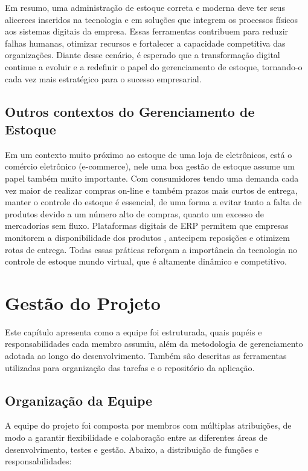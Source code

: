 \documentclass[
	12pt,				%
	openany,			%
	twoside,			%
	a4paper,			%
	english,			%
	brazil				%
	]{abntex2}
\begin{document}
Em resumo, uma administração de estoque correta e moderna deve ter seus alicerces inseridos na tecnologia e em soluções que integrem os processos físicos aos sistemas digitais da empresa. Essas ferramentas contribuem para reduzir falhas humanas, otimizar recursos e fortalecer a capacidade competitiva das organizações. Diante desse cenário, é esperado que a transformação digital continue a evoluir e a redefinir o papel do gerenciamento de estoque, tornando-o cada vez mais estratégico para o sucesso empresarial.

\section{Outros contextos do Gerenciamento de Estoque}
Em um contexto muito próximo ao estoque de uma loja de eletrônicos, está o comércio eletrônico (e-commerce), nele uma boa gestão de estoque assume um papel também muito importante. Com consumidores tendo uma demanda cada vez maior de realizar compras on-line e também prazos mais curtos de entrega, manter o controle do estoque é essencial, de uma forma a evitar tanto a falta de produtos devido a um número alto de compras, quanto um excesso de mercadorias sem fluxo. Plataformas digitais de ERP permitem que empresas monitorem a disponibilidade dos produtos , antecipem reposições e otimizem rotas de entrega. Todas essas práticas reforçam a importância da tecnologia no controle de estoque mundo virtual, que é altamente dinâmico e competitivo.

\chapter{Gestão do Projeto}

Este capítulo apresenta como a equipe foi estruturada, quais papéis e responsabilidades cada membro assumiu, além da metodologia de gerenciamento adotada ao longo do desenvolvimento. Também são descritas as ferramentas utilizadas para organização das tarefas e o repositório da aplicação.

\section{Organização da Equipe}

A equipe do projeto foi composta por membros com múltiplas atribuições, de modo a garantir flexibilidade e colaboração entre as diferentes áreas de desenvolvimento, testes e gestão. Abaixo, a distribuição de funções e responsabilidades:
\end{document}
